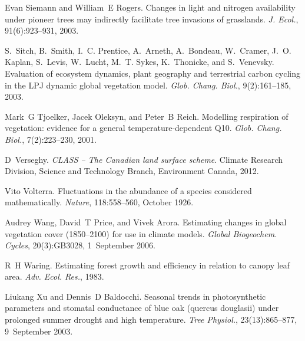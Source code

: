 \begin{DoxyDescription}
\item[\label{_CITEREF_Siemann2003-jl}%
\mbox{[}47\mbox{]}]Evan Siemann and William~E Rogers. Changes in light and nitrogen availability under pioneer trees may indirectly facilitate tree invasions of grasslands. {\itshape J. Ecol.}, 91(6)\+:923--931, 2003. 


\item[\label{_CITEREF_Sitch2003-847}%
\mbox{[}48\mbox{]}]S.~Sitch, B.~Smith, I.~C. Prentice, A.~Arneth, A.~Bondeau, W.~Cramer, J.~O. Kaplan, S.~Levis, W.~Lucht, M.~T. Sykes, K.~Thonicke, and S.~Venevsky. Evaluation of ecosystem dynamics, plant geography and terrestrial carbon cycling in the L\+P\+J dynamic global vegetation model. {\itshape Glob. Chang. Biol.}, 9(2)\+:161--185, 2003. 


\item[\label{_CITEREF_Tjoelker2001-uz}%
\mbox{[}49\mbox{]}]Mark~G Tjoelker, Jacek Oleksyn, and Peter~B Reich. Modelling respiration of vegetation\+: evidence for a general temperature-\/dependent Q10. {\itshape Glob. Chang. Biol.}, 7(2)\+:223--230, 2001.


\item[\label{_CITEREF_Verseghy2012-c0e}%
\mbox{[}50\mbox{]}]D~Verseghy. {\itshape C\+L\+A\+S\+S -- The Canadian land surface scheme}. Climate Research Division, Science and Technology Branch, Environment Canada, 2012.


\item[\label{_CITEREF_Volterra1926-iz}%
\mbox{[}51\mbox{]}]Vito Volterra. Fluctuations in the abundance of a species considered mathematically. {\itshape Nature}, 118\+:558--560, October 1926. 


\item[\label{_CITEREF_Wang2006-he}%
\mbox{[}52\mbox{]}]Audrey Wang, David~T Price, and Vivek Arora. Estimating changes in global vegetation cover (1850–2100) for use in climate models. {\itshape Global Biogeochem. Cycles}, 20(3)\+:G\+B3028, 1~September 2006. 


\item[\label{_CITEREF_Waring1983-wc}%
\mbox{[}53\mbox{]}]R~H Waring. Estimating forest growth and efficiency in relation to canopy leaf area. {\itshape Adv. Ecol. Res.}, 1983. 


\item[\label{_CITEREF_Xu2003-d75}%
\mbox{[}54\mbox{]}]Liukang Xu and Dennis~D Baldocchi. Seasonal trends in photosynthetic parameters and stomatal conductance of blue oak (quercus douglasii) under prolonged summer drought and high temperature. {\itshape Tree Physiol.}, 23(13)\+:865--877, 9~September 2003.


\end{DoxyDescription}